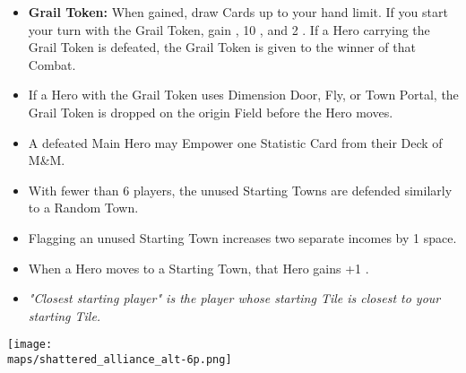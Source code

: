 \begin{multicols*}{2}
\begin{itemize}
  \item \textbf{Grail Token:} When gained, draw Cards up to your hand limit. If you start your turn with the Grail Token, gain , 10 , and 2 . If a Hero carrying the Grail Token is defeated, the Grail Token is given to the winner of that Combat.
  \item If a Hero with the Grail Token uses Dimension Door, Fly, or Town Portal, the Grail Token is dropped on the origin Field before the Hero moves.
  \item A defeated Main Hero may Empower one Statistic Card from their Deck of M\&M.
  \item With fewer than 6 players, the unused Starting Towns are defended similarly to a Random Town.
  \item Flagging an unused Starting Town increases two separate incomes by 1 space.
  \item When a Hero moves to a Starting Town, that Hero gains +1 .
  \item \textit{"Closest starting player" is the player whose starting Tile is closest to your starting Tile.}
\end{itemize}

\vspace*{\fill}

\begin{center}
  \texttt{[image: \\maps/shattered\_alliance\_alt-6p.png]}
  \vspace*{\fill}
\end{center}

\end{multicols*}
